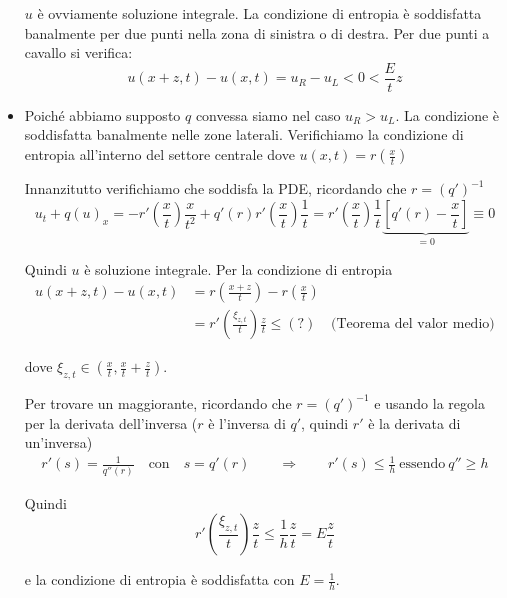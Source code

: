 \documentclass[10pt,a4paper,twoside,openright]{book}
\begin{document}
\begin{dimostrazione}
\begin{itemize}
\begin{figure}[H]
\begin{tikzpicture}[x=0.75pt,y=0.75pt,yscale=-1,xscale=1]
		\end{tikzpicture}
	\end{figure}
	\FloatBarrier


	$\displaystyle u$ è ovviamente soluzione integrale. La condizione di entropia è soddisfatta banalmente per due punti nella zona di sinistra o di destra. Per due punti a cavallo si verifica:
	\begin{equation*}
		u( x+z,t) -u( x,t) =u_{R} -u_{L} < 0< \frac{E}{t} z
	\end{equation*}
	\item Poiché abbiamo supposto $\displaystyle q$ convessa siamo nel caso $\displaystyle u_{R}  >u_{L}$. La condizione è soddisfatta banalmente nelle zone laterali. Verifichiamo la condizione di entropia all'interno del settore centrale dove $\displaystyle u( x,t) =r\left(\frac{x}{t}\right)$

	Innanzitutto verifichiamo che soddisfa la PDE, ricordando che $r=(q')^{-1}$
	\begin{equation*}
		u_{t} +q( u)_{x} =-r'\left(\frac{x}{t}\right)\frac{x}{t^{2}} +q'( r) r'\left(\frac{x}{t}\right)\frac{1}{t} =r'\left(\frac{x}{t}\right)\frac{1}{t}\underbrace{\left[ q'( r) -\frac{x}{t}\right]}_{=0} \equiv 0
	\end{equation*}

	Quindi $\displaystyle u$ è soluzione integrale. Per la condizione di entropia
	\begin{align*}
	u( x+z,t) -u( x,t) & =r\left(\frac{x+z}{t}\right) -r\left(\frac{x}{t}\right) & \\
	 & =r'\left(\frac{\xi _{z,t}}{t}\right)\frac{z}{t} \leqslant ( ?) & \text{(Teorema del valor medio)}
	\end{align*}

	dove $\displaystyle \xi _{z,t} \in \left(\frac{x}{t} ,\frac{x}{t} +\frac{z}{t}\right)$.

	Per trovare un maggiorante, ricordando che $\displaystyle r=( q')^{-1}$ e usando la regola per la derivata dell'inversa ($r$ è l'inversa di $q'$, quindi $r'$ è la derivata di un'inversa)
	\begin{gather*}
	r'( s) =\frac{1}{q''( r)} \quad \text{con} \quad s=q'( r) \qquad \Rightarrow \qquad r'( s) \leqslant \frac{1}{h} \ \text{essendo} \ q''\geqslant h
	\end{gather*}

	Quindi
	\begin{equation*}
		r'\left(\frac{\xi _{z,t}}{t}\right)\frac{z}{t} \leqslant \frac{1}{h}\frac{z}{t} = E \frac{z}{t}
	\end{equation*}

	e la condizione di entropia è soddisfatta con $\displaystyle E=\frac{1}{h}$.
\end{itemize}

\end{dimostrazione}
\end{document}
